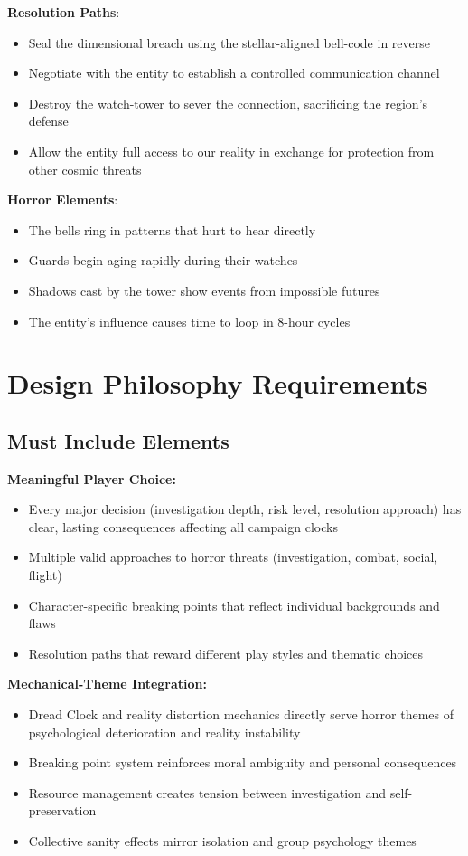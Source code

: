 \documentclass[11pt]{article}
\begin{document}
\begin{mdframed}[backgroundcolor=horrorbg]
\textbf{Resolution Paths}:
\begin{itemize}[leftmargin=*]
\item Seal the dimensional breach using the stellar-aligned bell-code in reverse
\item Negotiate with the entity to establish a controlled communication channel
\item Destroy the watch-tower to sever the connection, sacrificing the region's defense
\item Allow the entity full access to our reality in exchange for protection from other cosmic threats
\end{itemize}

\textbf{Horror Elements}:
\begin{itemize}[leftmargin=*]
\item The bells ring in patterns that hurt to hear directly
\item Guards begin aging rapidly during their watches
\item Shadows cast by the tower show events from impossible futures
\item The entity's influence causes time to loop in 8-hour cycles
\end{itemize}
\end{mdframed}

\section{Design Philosophy Requirements}

\subsection{Must Include Elements}

\textbf{Meaningful Player Choice:}
\begin{itemize}
\item Every major decision (investigation depth, risk level, resolution approach) has clear, lasting consequences affecting all campaign clocks
\item Multiple valid approaches to horror threats (investigation, combat, social, flight)
\item Character-specific breaking points that reflect individual backgrounds and flaws
\item Resolution paths that reward different play styles and thematic choices
\end{itemize}

\textbf{Mechanical-Theme Integration:}
\begin{itemize}
\item Dread Clock and reality distortion mechanics directly serve horror themes of psychological deterioration and reality instability
\item Breaking point system reinforces moral ambiguity and personal consequences
\item Resource management creates tension between investigation and self-preservation
\item Collective sanity effects mirror isolation and group psychology themes
\end{itemize}
\end{document}
